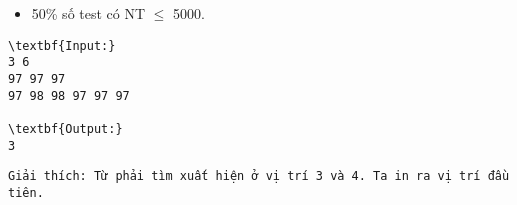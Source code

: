 \begin{itemize}
	\item 50\% số test có NT  $\le$  5000.
\end{itemize}
\begin{verbatim}
\textbf{Input:}
3 6
97 97 97
97 98 98 97 97 97

\textbf{Output:}
3\end{verbatim}
\begin{verbatim}
Giải thích: Từ phải tìm xuất hiện ở vị trí 3 và 4. Ta in ra vị trí đầu tiên.\end{verbatim}